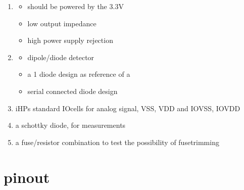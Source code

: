 \documentclass[letterpaper,10pt,english]{sphinxmanual}
\begin{document}
\begin{enumerate}
\begin{description}
\begin{itemize}
\end{itemize}

\end{description}

\item {} \begin{description}
\begin{itemize}
\item {} 
\sphinxAtStartPar
should be powered by the 3.3V

\item {} 
\sphinxAtStartPar
low output impedance

\item {} 
\sphinxAtStartPar
high power supply rejection

\end{itemize}

\end{description}

\item {} \begin{description}
\begin{itemize}
\item {} 
\sphinxAtStartPar
dipole/diode detector

\item {} 
\sphinxAtStartPar
a 1 diode design as reference of a

\item {} 
 serial connected diode design

\end{itemize}

\end{description}

\item {} 
\sphinxAtStartPar
iHPs standard IO\sphinxhyphen{}cells for analog signal, VSS, VDD and IOVSS, IOVDD

\item {} 
\sphinxAtStartPar
a schottky diode, for measurements

\item {} 
\sphinxAtStartPar
a fuse/resistor combination to test the possibility of fuse\sphinxhyphen{}trimming

\end{enumerate}


\section{pinout}
\label{\detokenize{specification:pinout}}
\end{document}
